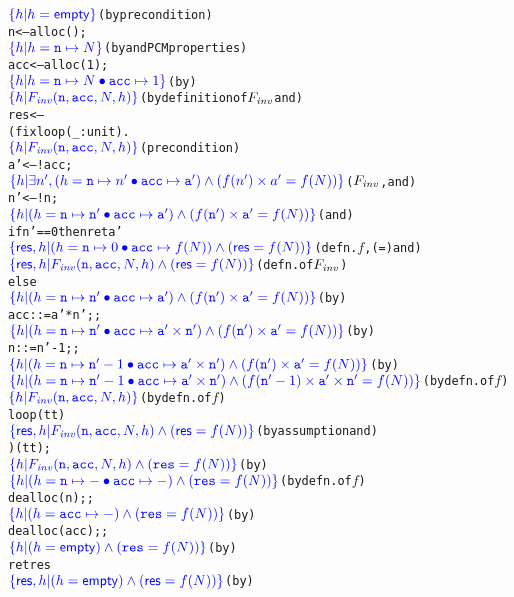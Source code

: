 \begin{alltt}
\(\spec{h | h = \hempty}\) {\normalfont ({by precondition})}
 n   <-- alloc();
\(\spec{h | h = \com{n} \mapsto N}\) {\normalfont ({by  and PCM properties})}
 acc <-- alloc(1); 
\(\spec{h | h = \com{n} \mapsto N \join \com{acc} \mapsto 1}\) {\normalfont ({by })}
\(\spec{h | \finv(\com{n}, \com{acc}, N, h)}\) {\normalfont ({by definition of \(\finv\) and })}
 res <-- 
  (fix loop (_ : unit). 
\(\spec{h | \finv(\com{n}, \com{acc}, N, h)}\) {\normalfont (precondition)}
     a' <-- !acc;
\(\spec{h | \exists{n'}, (h=\com{n}\mapsto{n'}\join\com{acc}\mapsto\com{a'})\wedge(f(n')\times{a'}=f(N))}\) {\normalfont (\(\finv\),  and )}
     n' <-- !n;
\(\spec{h | (h=\com{n}\mapsto{\com{n'}}\join\com{acc}\mapsto\com{a'})\wedge(f(\com{n'})\times{\com{a'}}=f(N))}\) {\normalfont ( and )}
     if n' == 0 then ret a'
\(\spec{\res, h | (h=\com{n}\mapsto{0}\join\com{acc}\mapsto{f(N)})\wedge(\res=f(N))}\) {\normalfont (defn. \(f\), (=) and )}
\(\spec{\res, h | \finv(\com{n}, \com{acc}, N, h)\wedge(\res=f(N))}\) {\normalfont (defn. of \(\finv\))}
     else 
\(\spec{h | (h=\com{n}\mapsto\com{n'}\join\com{acc}\mapsto{\com{a'}})\wedge(f(\com{n'})\times{\com{a'}}=f(N))}\) {\normalfont (by )}
          acc ::= a' * n';;
\(\spec{h | (h=\com{n}\mapsto\com{n'}\join\com{acc}\mapsto{\com{a'}\times\com{n'}})\wedge(f(\com{n'})\times{\com{a'}}=f(N))}\) {\normalfont (by )}
          n   ::= n' - 1;;
\(\spec{h | (h=\com{n}\mapsto\com{n'}-1\join\com{acc}\mapsto{\com{a'}\times\com{n'}})\wedge(f(\com{n'})\times{\com{a'}}=f(N))}\) {\normalfont (by )}
\(\spec{h | (h=\com{n}\mapsto\com{n'}-1\join\com{acc}\mapsto{\com{a'}\times\com{n'}})\wedge(f(\com{n'}-1)\times{\com{a'}\times\com{n'}}=f(N))}\) {\normalfont (by defn. of \(f\))}
\(\spec{h | \finv(\com{n}, \com{acc}, N, h)}\) {\normalfont (by defn. of \(f\))}
          loop(tt) 
\(\spec{\res, h | \finv(\com{n}, \com{acc}, N, h)\wedge(\res=f(N))}\) {\normalfont (by assumption and )}
  )(tt);
\(\spec{h | \finv(\com{n}, \com{acc}, N, h) \wedge (\com{res}=f(N))}\) {\normalfont (by )}
\(\spec{h | (h=\com{n}\mapsto{-}\join\com{acc}\mapsto{-})\wedge(\com{res}=f(N))}\) {\normalfont (by defn. of \(f\))}
 dealloc(n);;
\(\spec{h | (h=\com{acc}\mapsto{-}) \wedge (\com{res}=f(N))}\) {\normalfont (by )}
 dealloc(acc);;
\(\spec{h | (h=\hempty)\wedge(\com{res}=f(N))}\) {\normalfont (by )}
 ret res
\(\spec{\res, h | (h=\hempty)\wedge(\res=f(N))}\) {\normalfont (by )}
\end{alltt}

